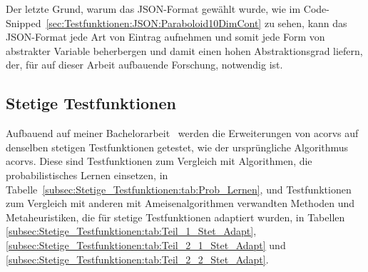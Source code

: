 \documentclass[fontsize=12, a4aper]{scrartcl}
\begin{document}
	Der letzte Grund, warum das JSON-Format gewählt wurde, wie im Code-Snipped~\ref{sec:Testfunktionen:JSON:Paraboloid10DimCont} zu sehen, kann das JSON-Format jede Art von Eintrag aufnehmen und somit jede Form von abstrakter Variable beherbergen und damit einen hohen Abstraktionsgrad liefern, der, für auf dieser Arbeit aufbauende Forschung, notwendig ist.
	
	\subsection{Stetige Testfunktionen} \label{subsec:Stetige_Testfunktionen}
	
	Aufbauend auf meiner Bachelorarbeit~\cite{FCM_2019} werden die Erweiterungen von \ac{acorvs} auf denselben stetigen Testfunktionen getestet, wie der ursprüngliche Algorithmus \ac{acorvs}. Diese sind Testfunktionen zum Vergleich mit Algorithmen, die probabilistisches Lernen einsetzen, in Tabelle~\ref{subsec:Stetige_Testfunktionen:tab:Prob_Lernen}, und Testfunktionen zum Vergleich mit anderen mit Ameisenalgorithmen verwandten Methoden und Metaheuristiken, die für stetige Testfunktionen adaptiert wurden, in Tabellen \ref{subsec:Stetige_Testfunktionen:tab:Teil_1_Stet_Adapt}, \ref{subsec:Stetige_Testfunktionen:tab:Teil_2_1_Stet_Adapt} und \ref{subsec:Stetige_Testfunktionen:tab:Teil_2_2_Stet_Adapt}.\hfill\newline
	
\end{document}
